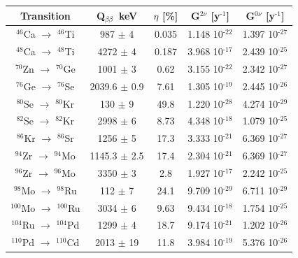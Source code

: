 \documentclass[main.tex]{subfiles}
\begin{document}
\begin{table}
\centering
\begin{tabular}{|c|c|c|c|c|}
\hline
Transition & Q$_{\beta\beta}$~keV & $\eta$ [\%] & G$^{\text{2}\nu}$ [y$^{\text{-1}}$] & G$^{\text{0}\nu}$ [y$^{\text{-1}}$] \\
\hline
$^{\text{46}}$Ca $\rightarrow$ $^{\text{46}}$Ti & 987      $\pm$ 4   & 0.035  & 1.148 10$^{\text{-22}}$ & 1.397 10$^{\text{-27}}$\\
\hline
$^{\text{48}}$Ca $\rightarrow$ $^{\text{48}}$Ti & 4272     $\pm$ 4   & 0.187  & 3.968 10$^{\text{-17}}$ & 2.439 10$^{\text{-25}}$\\ 
\hline
$^{\text{70}}$Zn $\rightarrow$ $^{\text{70}}$Ge & 1001     $\pm$ 3   & 0.62   & 3.155 10$^{\text{-22}}$ & 2.342 10$^{\text{-27}}$\\ 
\hline
$^{\text{76}}$Ge $\rightarrow$ $^{\text{76}}$Se & 2039.6   $\pm$ 0.9 & 7.61   & 1.305 10$^{\text{-19}}$ & 2.445 10$^{\text{-26}}$\\ 
\hline
$^{\text{80}}$Se $\rightarrow$ $^{\text{80}}$Kr & 130      $\pm$ 9   & 49.8   & 1.220 10$^{\text{-28}}$ & 4.274 10$^{\text{-29}}$\\ 
\hline
$^{\text{82}}$Se $\rightarrow$ $^{\text{82}}$Kr & 2998     $\pm$ 6   & 8.73   & 4.348 10$^{\text{-18}}$ & 1.079 10$^{\text{-25}}$\\ 
\hline
$^{\text{86}}$Kr $\rightarrow$ $^{\text{86}}$Sr & 1256     $\pm$ 5   & 17.3   & 3.333 10$^{\text{-21}}$ & 6.369 10$^{\text{-27}}$\\ 
\hline
$^{\text{94}}$Zr $\rightarrow$ $^{\text{94}}$Mo & 1145.3   $\pm$ 2.5 & 17.4   & 2.304 10$^{\text{-21}}$ & 6.369 10$^{\text{-27}}$\\ 
\hline
$^{\text{96}}$Zr $\rightarrow$ $^{\text{96}}$Mo & 3350     $\pm$ 3   & 2.8    & 1.927 10$^{\text{-17}}$ & 2.242 10$^{\text{-25}}$\\ 
\hline
$^{\text{98}}$Mo $\rightarrow$ $^{\text{98}}$Ru & 112      $\pm$ 7   & 24.1   & 9.709 10$^{\text{-29}}$ & 6.711 10$^{\text{-29}}$\\ 
\hline
$^{\text{100}}$Mo $\rightarrow$ $^{\text{100}}$Ru & 3034   $\pm$ 6   & 9.63   & 9.434 10$^{\text{-18}}$ & 1.754 10$^{\text{-25}}$\\ 
\hline
$^{\text{104}}$Ru $\rightarrow$ $^{\text{104}}$Pd & 1299   $\pm$ 4   & 18.7   & 9.174 10$^{\text{-21}}$ & 1.202 10$^{\text{-26}}$\\ 
\hline
$^{\text{110}}$Pd $\rightarrow$ $^{\text{110}}$Cd & 2013   $\pm$ 19  & 11.8   & 3.984 10$^{\text{-19}}$ & 5.376 10$^{\text{-26}}$\\ 

\end{tabular}
\end{table}
\end{document}
